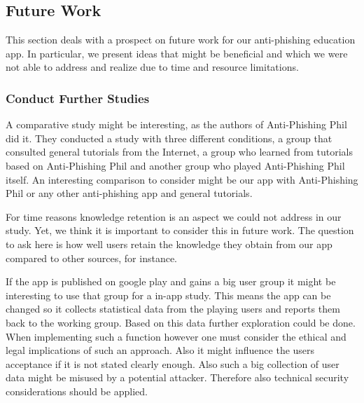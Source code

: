 \subsection{Future Work}
\label{s:future_work}
This section deals with a prospect on future work for our anti-phishing education app.
 In particular, we present ideas that might be beneficial and which we were not able to address and realize due to time and resource limitations.

\subsubsection{Conduct Further Studies}
\begin{description}[leftmargin=0cm]
	\item[Comparative Study:] A comparative study might be interesting, as the authors of Anti-Phishing Phil~\cite{sheng2007antiphishingphil} did it.
	They conducted a study with three different conditions,  a group that consulted general tutorials from the Internet, a  group who learned from tutorials based on Anti-Phishing Phil and another group who played Anti-Phishing Phil itself.
	An interesting comparison to consider might be our app with Anti-Phishing Phil or any other anti-phishing app and general tutorials.
	\item[Study on Retention:] For time reasons knowledge retention is an aspect we could not address in our study.
	Yet, we think it is important to consider this in future work.
	The question to ask here is how well users retain the knowledge they obtain from our app compared to other sources, for instance.
	\item[In-App Statistics:] If the app is published on google play and gains a big user group it might be interesting to use that group for a in-app study. This means the app can be changed so it collects statistical data from the playing users and reports them back to the working group. Based on this data further exploration could be done. When implementing such a function however one must consider the ethical and legal implications of such an approach. Also it might influence the users acceptance if it is not stated clearly enough. Also such a big collection of user data might be misused by a potential attacker. Therefore also technical security considerations should be applied.
\end{description}

